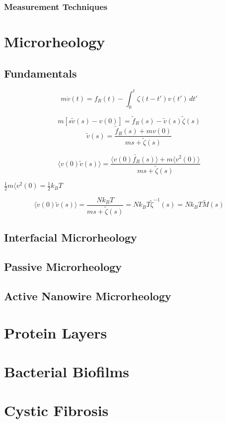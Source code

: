 \subsubsection{Measurement Techniques}
\section{Microrheology}
\subsection{Fundamentals}

\begin{equation}
  m\dot{v}(t) = f_R(t) - \int_0^t\zeta(t-t')v(t')\,dt'
\end{equation}

\begin{equation}
  m\left[s\tilde{v}(s) - v(0)\right] = \tilde{f}_R(s) - \tilde{v}(s)\tilde{\zeta}(s)
\end{equation}
\begin{equation}
  \tilde{v}(s) = \frac{\tilde{f}_R(s) + mv(0)}{ms + \tilde{\zeta}(s)}
\end{equation}

\begin{equation}
  \langle v(0)\tilde{v}(s) \rangle = \frac{\langle v(0)\tilde{f_R}(s)\rangle + m \langle v^2(0)\rangle}{ms + \tilde{\zeta}(s)}
\end{equation}

$\frac{1}{2}m\langle v^2(0) = \frac{1}{2}k_B T$

\begin{equation}
  \langle v(0)\tilde{v}(s) \rangle = \frac{Nk_B T}{ms + \tilde{\zeta}(s)} = Nk_B T \tilde{\zeta}^{-1}(s) = Nk_B T \tilde{M}(s)
\end{equation}

\subsection{Interfacial Microrheology}

\subsection{Passive Microrheology}


\subsection{Active Nanowire Microrheology}


\section{Protein Layers}
\section{Bacterial Biofilms}
\section{Cystic Fibrosis}